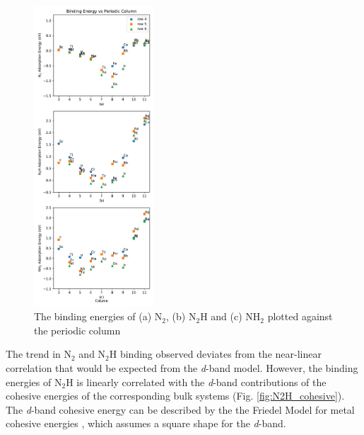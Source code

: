 \begin{figure}
    \centering
    \includegraphics[width=0.4\textwidth]{Images/adsorption_rows.pdf}
    \caption{The binding energies of (a) N$_2$, (b) N$_2$H and (c) NH$_2$ plotted against the periodic column}
    \label{fig:column_trends}
\end{figure}

The trend in N$_2$ and N$_2$H binding observed deviates from the near-linear correlation that would be expected from the \textit{d}-band model. However, the binding energies of N$_2$H is linearly correlated with the \textit{d}-band contributions of the cohesive energies of the corresponding bulk systems (Fig. \ref{fig:N2H_cohesive}). The \textit{d}-band cohesive energy can be described by the the Friedel Model for metal cohesive energies \cite{1969TPom}, which assumes a square shape for the \textit{d}-band.%




